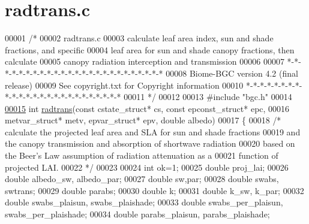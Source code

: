 \hypertarget{radtrans_8c_source}{}\section{radtrans.\+c}
\label{radtrans_8c_source}

\begin{DoxyCode}
00001 \textcolor{comment}{/* }
00002 \textcolor{comment}{radtrans.c}
00003 \textcolor{comment}{calculate leaf area index, sun and shade fractions, and specific}
00004 \textcolor{comment}{leaf area for sun and shade canopy fractions, then calculate}
00005 \textcolor{comment}{canopy radiation interception and transmission }
00006 \textcolor{comment}{}
00007 \textcolor{comment}{*-*-*-*-*-*-*-*-*-*-*-*-*-*-*-*-*-*-*-*-*-*-*-*-*}
00008 \textcolor{comment}{Biome-BGC version 4.2 (final release)}
00009 \textcolor{comment}{See copyright.txt for Copyright information}
00010 \textcolor{comment}{*-*-*-*-*-*-*-*-*-*-*-*-*-*-*-*-*-*-*-*-*-*-*-*-*}
00011 \textcolor{comment}{*/}
00012 
00013 \textcolor{preprocessor}{#include "bgc.h"}
00014 
\hypertarget{radtrans_8c_source_l00015}{}\hyperlink{radtrans_8c_a323e7fe52f825be6dfa95a158a812db4}{00015} \textcolor{keywordtype}{int} \hyperlink{radtrans_8c_a323e7fe52f825be6dfa95a158a812db4}{radtrans}(\textcolor{keyword}{const} cstate\_struct* cs, \textcolor{keyword}{const} epconst\_struct* epc, 
00016 metvar\_struct* metv, epvar\_struct* epv, \textcolor{keywordtype}{double} albedo)
00017 \{
00018     \textcolor{comment}{/* calculate the projected leaf area and SLA for sun and shade fractions}
00019 \textcolor{comment}{    and the canopy transmission and absorption of shortwave radiation}
00020 \textcolor{comment}{    based on the Beer's Law assumption of radiation attenuation as a }
00021 \textcolor{comment}{    function of projected LAI.}
00022 \textcolor{comment}{    */}
00023 
00024     \textcolor{keywordtype}{int} ok=1;
00025     \textcolor{keywordtype}{double} proj\_lai;
00026     \textcolor{keywordtype}{double} albedo\_sw, albedo\_par;
00027     \textcolor{keywordtype}{double} sw,par;
00028     \textcolor{keywordtype}{double} swabs, swtrans;
00029     \textcolor{keywordtype}{double} parabs;
00030     \textcolor{keywordtype}{double} k;
00031     \textcolor{keywordtype}{double} k\_sw, k\_par;
00032     \textcolor{keywordtype}{double} swabs\_plaisun, swabs\_plaishade;
00033     \textcolor{keywordtype}{double} swabs\_per\_plaisun, swabs\_per\_plaishade;
00034     \textcolor{keywordtype}{double} parabs\_plaisun, parabs\_plaishade;

\end{DoxyCode}
